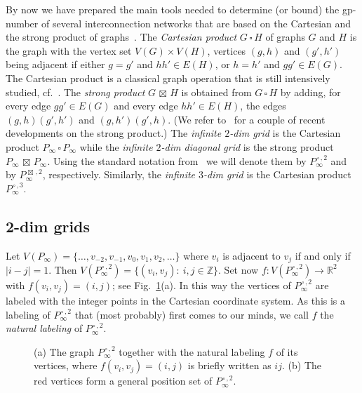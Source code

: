 \documentclass[12pt]{article}
\def\cp{\,\square\,}
\def\sp{\,\boxtimes\,}
\begin{document}
By now we have prepared the main tools needed to determine (or bound) the gp-number of several interconnection networks that are based on the Cartesian and the strong product of graphs~\cite{hik-2011}. The {\em Cartesian product} $G\cp H$ of graphs $G$ and $H$ is the graph with the vertex set $V(G) \times V(H)$, vertices $(g,h)$ and $(g',h')$ being adjacent if either $g=g'$ and $hh'\in E(H)$, or $h=h'$ and $gg'\in E(G)$. The Cartesian product is a classical graph operation that is still intensively studied, cf.~\cite{bresar-2017, bog-2017, rall-2017, yang-2017}. The {\em strong product} $G\sp H$ is obtained from $G\cp H$ by adding, for every edge $gg'\in E(G)$ and every edge $hh'\in E(H)$, the edges $(g,h)(g',h')$ and $(g,h')(g',h)$. (We refer to~\cite{barrag-2016, zhao-2017} for a couple of recent developments on the strong product.) The {\em infinite $2$-dim grid} is the Cartesian product $P_{\infty}\cp P_{\infty}$ while the {\em infinite $2$-dim diagonal grid} is the strong product $P_{\infty}\sp P_{\infty}$. Using the standard notation from~\cite{hik-2011} we will denote them by $P_{\infty}^{\cp,2}$ and by $P_{\infty}^{\sp,2}$, respectively. Similarly, the {\em infinite $3$-dim grid} is the Cartesian product $P_{\infty}^{\cp,3}$.

\subsection{2-dim grids}

Let $V(P_{\infty}) = \{\ldots, v_{-2}, v_{-1}, v_0, v_1, v_2, \ldots \}$ where $v_i$ is adjacent to $v_j$ if and only if $|i-j| = 1$. Then $V(P_{\infty}^{\cp,2}) = \{(v_i,v_j):\ i,j\in {\mathbb Z}\}$. Set now $f: V(P_{\infty}^{\cp,2}) \rightarrow {\mathbb R}^2$ with $f(v_i,v_j) = (i,j)$; see Fig.~\ref{fig:FIGR}(a). In this way the vertices of $P_{\infty}^{\cp,2}$ are labeled with the integer points in the Cartesian coordinate system. As this is a labeling of $P_{\infty}^{\cp,2}$ that (most probably) first comes to our minds, we call $f$ the {\em natural labeling} of $P_{\infty}^{\cp,2}$. 

\begin{figure}[ht!]
	\begin{center}
	\end{center}
	\caption{(a) The graph $P_{\infty}^{\cp,2}$ together with the natural labeling $f$ of its vertices, where $f(v_i,v_j) = (i,j)$ is briefly written as $ij$. (b) The red vertices form a general position set of $P_{\infty}^{\cp,2}$.}
	\label{fig:FIGR}
\end{figure}
\end{document}
